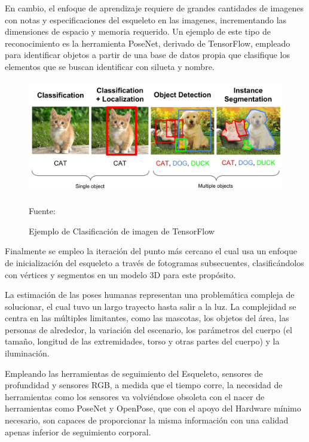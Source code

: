 En cambio, el enfoque de aprendizaje requiere de grandes cantidades de imagenes con notas y especificaciones del esqueleto en las imagenes, incrementando las dimensiones de espacio y memoria requerido. Un ejemplo de este tipo de reconocimiento es la herramienta PoseNet, derivado de TensorFlow, empleado para identificar objetos a partir de una base de datos propia que clasifique los elementos que se buscan identificar con silueta y nombre.

\begin{figure}[t!]
	\centering
	\includegraphics[width=13cm,height=5cm,]{./Images/ejemplotensorflow.jpg}
	\caption{Ejemplo de Clasificación de imagen de TensorFlow}
	\footnotesize Fuente: \cite{ejemplotensorflow}
	\label{tensorfl}
\end{figure}

Finalmente se empleo la iteración del punto más cercano \cite{grest2005nonlinear} el cual usa un enfoque de inicialización del esqueleto a través de fotogramas subsecuentes, clasificándolos con vértices y segmentos en un modelo 3D para este propósito.

La estimación de las poses humanas representan una problemática compleja de solucionar, el cual tuvo un largo trayecto hasta salir a la luz. La complejidad se centra en las múltiples limitantes, como las mascotas, los objetos del área, las personas de alrededor, la variación del escenario, los parámetros del cuerpo (el tamaño, longitud de las extremidades, torso y otras partes del cuerpo) y la iluminación.

Empleando las herramientas de seguimiento del Esqueleto, sensores de profundidad y sensores RGB, a medida que el tiempo corre, la necesidad de herramientas como los sensores va volviéndose obsoleta con el nacer de herramientas como PoseNet y OpenPose, que con el apoyo del Hardware mínimo necesario, son capaces de proporcionar la misma información con una calidad apenas inferior de seguimiento corporal.


